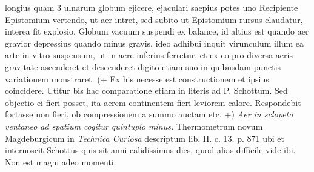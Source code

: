                      longius quam 3 ulnarum globum ejicere,  ejaculari saepius potes uno Recipiente Epistomium\protect{} vertendo, ut aer intret, sed subito  ut Epistomium\protect{} rursus claudatur, interea fit  explosio.
                     \pend 
                     \newpage
                     \pstart  {} Globum vacuum suspendi ex balance, id altius est quando aer  gravior depressius quando minus gravis.  ideo adhibui inquit virunculum  illum ea arte in vitro suspensum, ut in aere  inferius ferretur, et ex eo pro diversa aeris  gravitate ascenderet et descenderet digito  etiam suo in quibusdam punctis variationem monstraret. (+ Ex his necesse est constructionem   et ipsius coincidere. Utitur bis hac comparatione  etiam in literis ad P. Schottum\protect{}. Sed objectio  ei fieri posset, ita aerem continentem fieri leviorem calore. Respondebit fortasse non fieri, ob compressionem a summo auctam etc. +)\pend \pstart {} \textit{Aer in sclopeto  ventaneo ad spatium cogitur quintuplo minus.}\pend \pstart {} Thermometrum\protect{}  novum Magdeburgicum in \textit{Technica Curiosa} descriptum  lib. II. c. 13. p. 871 ubi et internoscit Schottus\protect{}  quis sit  anni calidissimus dies, quod alias  difficile vide ibi. Non est magni adeo momenti.
                     \pend 